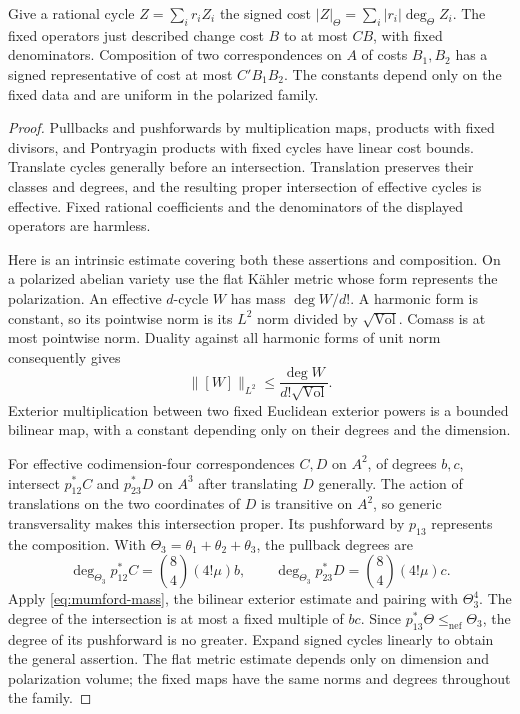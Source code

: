 \begin{lemma}\label{lem:mumford-cost}
Give a rational cycle $Z=\sum_i r_iZ_i$ the signed cost
$|Z|_\Theta=\sum_i|r_i|\deg_\Theta Z_i$.
The fixed operators just described change cost $B$ to at most $CB$,
with fixed denominators. Composition of two correspondences on $A$
of costs $B_1,B_2$ has a signed representative of cost at most
$C'B_1B_2$. The constants depend only on the fixed data and are uniform
in the polarized family.
\end{lemma}

\begin{proof}
Pullbacks and pushforwards by multiplication maps, products with fixed
divisors, and Pontryagin products with fixed cycles have linear cost
bounds. Translate cycles generally before an intersection. Translation
preserves their classes and degrees, and the resulting proper
intersection of effective cycles is effective.
Fixed rational coefficients and the denominators of the displayed
operators are harmless.

Here is an intrinsic estimate covering both these assertions and
composition. On a polarized abelian variety use the flat K\"ahler
metric whose form represents the polarization. An effective
$d$-cycle $W$ has mass $\deg W/d!$. A harmonic form is constant, so
its pointwise norm is its $L^2$ norm divided by
$\sqrt{\operatorname{Vol}}$. Comass is at most pointwise norm.
Duality against all harmonic forms of unit norm consequently gives
\begin{equation}\label{eq:mumford-mass}
 \|[W]\|_{L^2}\leq
       \frac{\deg W}{d!\sqrt{\operatorname{Vol}}}.
\end{equation}
Exterior multiplication between two fixed Euclidean exterior powers
is a bounded bilinear map, with a constant depending only on their
degrees and the dimension.

For effective codimension-four correspondences $C,D$ on $A^2$, of
degrees $b,c$, intersect $p_{12}^*C$ and $p_{23}^*D$ on $A^3$
after translating $D$ generally. The action of translations on
the two coordinates of $D$ is transitive on $A^2$, so generic
transversality makes this intersection proper.
Its pushforward by $p_{13}$ represents the composition.
With $\Theta_3=\theta_1+\theta_2+\theta_3$, the pullback degrees are
\[
 \deg_{\Theta_3}p_{12}^*C
   =\binom84(4!\mu)b,\qquad
 \deg_{\Theta_3}p_{23}^*D
   =\binom84(4!\mu)c.
\]
Apply \eqref{eq:mumford-mass}, the bilinear exterior estimate and pairing with
$\Theta_3^4$. The degree of the intersection is at most a fixed
multiple of $bc$. Since
$p_{13}^*\Theta\leq_{\mathrm{nef}}\Theta_3$, the degree of its
pushforward is no greater. Expand signed cycles linearly to obtain
the general assertion. The flat metric estimate depends only on
dimension and polarization volume; the fixed maps have the same
norms and degrees throughout the family.
\end{proof}

